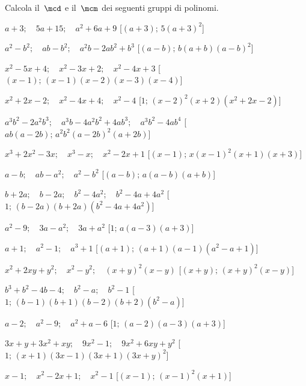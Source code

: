 \begin{esercizio}[\Ast]
\label{ese:18.1}
Calcola il~\(\mcd\) e il~\(\mcm\) dei seguenti gruppi di polinomi.
\begin{enumeratea}
 \item \(a+3;\quad 5a+15;\quad a^{2}+6a+9\)
  \hfill [\((a+3);\,5(a+3)^2\)]
 \item \(a^{2}-b^{2};\quad ab-b^{2};\quad a^{2}b-2ab^{2}+b^{3}\)
  \hfill [\((a-b);\,b(a+b)(a-b)^2\)]
 \item \(x^{2}-5x+4;\quad x^{2}-3x+2;\quad x^{2}-4x+3\)
  \hfill [\((x-1);\,(x-1)(x-2)(x-3)(x-4)\)]
 \item \(x^{2}+2x-2;\quad x^{2}-4x+4;\quad x^{2}-4\)
  \hfill [\(1;\,(x-2)^2(x+2)\left(x^2+2x-2\right)\)]
 \item \(a^{3}b^{2}-2a^{2}b^{3};\quad a^{3}b-4a^{2}b^{2}+4ab^{3};
        \quad a^{3}b^{2}-4ab^{4}\)
  \hfill [\(ab(a-2b);\,a^2 b^2(a-2b)^2(a+2b)\)]
 \item \(x^{3}+2x^{2}-3x;\quad x^{3}-x;\quad x^{2}-2x+1\)
  \hfill [\((x-1);\,x(x-1)^2(x+1)(x+3)\)]
 \item \(a-b;\quad ab-a^{2};\quad a^{2}-b^{2}\)
  \hfill [\((a-b);\,a(a-b)(a+b)\)]
 \item \(b+2a;\quad b-2a;\quad b^{2}-4a^{2};\quad b^{2}-4a+4a^{2}\)
  \hfill [\(1;\,(b-2a)(b+2a)\left(b^2-4a+4a^2\right)\)]
 \item \(a^{2}-9;\quad 3a-a^{2};\quad 3a+a^{2}\)
  \hfill [\(1;\,a(a-3)(a+3)\)]
 \item \(a+1;\quad a^{2}-1;\quad a^{3}+1\)
  \hfill [\((a+1);\,(a+1)(a-1)\left(a^2-a+1\right)\)]
 \item \(x^{2}+2xy+y^{2};\quad x^{2}-y^{2};\quad (x+y)^{2}(x-y)\)
  \hfill [\((x+y);\,(x+y)^2(x-y)\)]
 \item \(b^{3}+b^{2}-4b-4;\quad b^{2}-a;\quad b^{2}-1\)
  \hfill [\(1;\,(b-1)(b+1)(b-2)(b+2)\left(b^2-a\right)\)]
 \item \(a-2;\quad a^{2}-9;\quad a^{2}+a-6\)
  \hfill [\(1;\,(a-2)(a-3)(a+3)\)]
 \item \(3x+y+3x^{2}+xy;\quad 9x^{2}-1;\quad 9x^{2}+6xy+y^{2}\)
  \hfill [\(1;\,(x+1)(3x-1)(3x+1)(3x+y)^2\)]
 \item \(x-1;\quad x^{2}-2x+1;\quad x^{2}-1\)%
  \hfill [\((x-1);\,(x-1)^2(x+1)\)]
\end{enumeratea}
\end{esercizio}

